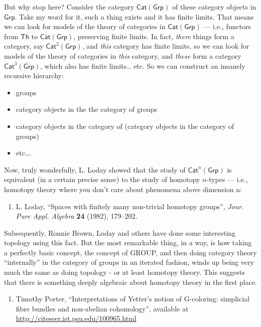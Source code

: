 \documentclass{article}
\def\tightlist{}
\begin{document}
But why stop here? Consider the category \(\mathsf{Cat}(\mathsf{Grp})\)
of these category objects in \(\mathsf{Grp}\). Take my word for it, such
a thing exists and it has finite limits. That means we can look for
models of the theory of categories in \(\mathsf{Cat}(\mathsf{Grp})\) ---
i.e., functors from \(\mathsf{Th}\) to \(\mathsf{Cat}(\mathsf{Grp})\),
preserving finite limits. In fact, \emph{there} things form a category,
say \(\mathsf{Cat}^2(\mathsf{Grp})\), and \emph{this} category has
finite limits, so we can look for models of the theory of categories in
\emph{this} category, and \emph{these} form a category
\(\mathsf{Cat}^3(\mathsf{Grp})\), which also has finite limits\ldots{}
etc. So we can construct an insanely recursive hierarchy:

\begin{itemize}
\tightlist
\item
  groups
\item
  category objects in the the category of groups
\item
  category objects in the category of (category objects in the category
  of groups)
\item
  etc\ldots.
\end{itemize}

Now, truly wonderfully, L. Loday showed that the study of
\(\mathsf{Cat}^n(\mathsf{Grp})\) is equivalent (in a certain precise
sense) to the study of homotopy \(n\)-types --- i.e., homotopy theory
where you don't care about phenomena above dimension n:

\begin{enumerate}
\def\labelenumi{\arabic{enumi})}
\setcounter{enumi}{1}
\tightlist
\item
  L. Loday, ``Spaces with finitely many non-trivial homotopy groups'',
  \emph{Jour. Pure Appl. Algebra} \textbf{24} (1982), 179--202.
\end{enumerate}

Subsequently, Ronnie Brown, Loday and others have done some interesting
topology using this fact. But the most remarkable thing, in a way, is
how taking a perfectly basic concept, the concept of GROUP, and then
doing category theory ``internally'' in the category of groups in an
iterated fashion, winds up being very much the same as doing topology -
or at least homotopy theory. This suggests that there is something
deeply algebraic about homotopy theory in the first place.

\begin{enumerate}
\def\labelenumi{\arabic{enumi})}
\setcounter{enumi}{2}
\tightlist
\item
  Timothy Porter, ``Interpretations of Yetter's notion of G-coloring:
  simplicial fibre bundles and non-abelian cohomology'', available at
  \url{http://citeseer.ist.psu.edu/100965.html}
\end{enumerate}
\end{document}
